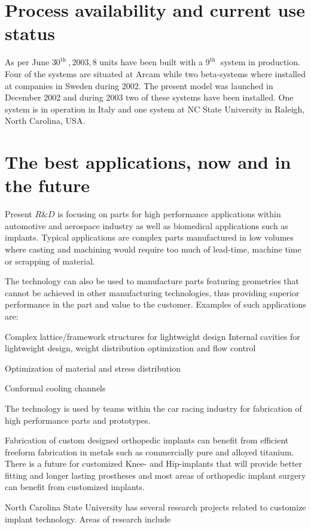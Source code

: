 \documentclass[10pt]{article}
\begin{document}
\section*{Process availability and current use status}
As per June $30^{\text {th }}, 2003,8$ units have been built with a $9^{\text {th }}$ system in production. Four of the systems are situated at Arcam while two beta-systems where installed at companies in Sweden during 2002. The present model was launched in December 2002 and during 2003 two of these systems have been installed. One system is in operation in Italy and one system at NC State University in Raleigh, North Carolina, USA.

\section*{The best applications, now and in the future}
Present $R \& D$ is focusing on parts for high performance applications within automotive and aerospace industry as well as biomedical applications such as implants. Typical applications are complex parts manufactured in low volumes where casting and machining would require too much of lead-time, machine time or scrapping of material.

The technology can also be used to manufacture parts featuring geometries that cannot be achieved in other manufacturing technologies, thus providing superior\\
performance in the part and value to the customer. Examples of such applications are:

Complex lattice/framework structures for lightweight design Internal cavities for lightweight design, weight distribution optimization and flow control

Optimization of material and stress distribution

Conformal cooling channels

The technology is used by teams within the car racing industry for fabrication of high performance parts and prototypes.

Fabrication of custom designed orthopedic implants can benefit from efficient freeform fabrication in metals such as commercially pure and alloyed titanium. There is a future for customized Knee- and Hip-implants that will provide better fitting and longer lasting prostheses and most areas of orthopedic implant surgery can benefit from customized implants.

North Carolina State University has several research projects related to customize implant technology. Areas of research include
\end{document}
